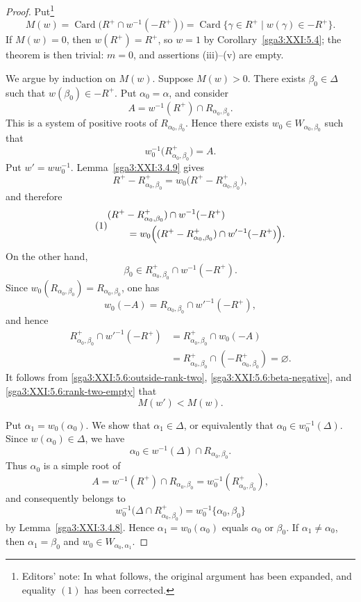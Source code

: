 \begin{proof}
Put\footnote{Editors' note: In what follows, the original argument has
been expanded, and equality \((1)\) has been corrected.}
\[
 M(w)
 =\operatorname{Card}\bigl(R^+\cap w^{-1}(-R^+)\bigr)
 =\operatorname{Card}\{\gamma\in R^+\mid w(\gamma)\in-R^+\}.
\]
If \(M(w)=0\), then \(w(R^+)=R^+\), so
\(w=1\) by Corollary~\ref{sga3:XXI:5.4}; the theorem is then
trivial: \(m=0\), and assertions (iii)--(v) are empty.

We argue by induction on \(M(w)\). Suppose \(M(w)>0\). There exists
\(\beta_0\in\Delta\) such that \(w(\beta_0)\in-R^+\). Put
\(\alpha_0=\alpha\), and consider
\[
 A=w^{-1}(R^+)\cap R_{\alpha_0,\beta_0}.
\]
This is a system of positive roots of
\(R_{\alpha_0,\beta_0}\). Hence there exists
\(w_0\in W_{\alpha_0,\beta_0}\) such that
\[
 w_0^{-1}\bigl(R^+_{\alpha_0,\beta_0}\bigr)=A.
\]
Put \(w'=ww_0^{-1}\). Lemma~\ref{sga3:XXI:3.4.9} gives
\[
 R^+-R^+_{\alpha_0,\beta_0}
 =
 w_0\bigl(R^+-R^+_{\alpha_0,\beta_0}\bigr),
\]
and therefore
\begin{equation}
\tag{1}
\label{sga3:XXI:5.6:outside-rank-two}
\begin{split}
 &(R^+-R^+_{\alpha_0,\beta_0})\cap w^{-1}(-R^+)\\
 &\qquad=
 w_0\Bigl((R^+-R^+_{\alpha_0,\beta_0})
             \cap w'^{-1}(-R^+)\Bigr).
\end{split}
\end{equation}
On the other hand,
\begin{equation}
\tag{2}
\label{sga3:XXI:5.6:beta-negative}
 \beta_0\in
 R^+_{\alpha_0,\beta_0}\cap w^{-1}(-R^+).
\end{equation}
Since
\(w_0(R_{\alpha_0,\beta_0})=R_{\alpha_0,\beta_0}\), one has
\[
 w_0(-A)
 =R_{\alpha_0,\beta_0}\cap w'^{-1}(-R^+),
\]
and hence
\begin{equation}
\tag{\(2'\)}
\label{sga3:XXI:5.6:rank-two-empty}
\begin{split}
 R^+_{\alpha_0,\beta_0}\cap w'^{-1}(-R^+)
 &=
 R^+_{\alpha_0,\beta_0}\cap w_0(-A)\\
 &=
 R^+_{\alpha_0,\beta_0}\cap(-R^+_{\alpha_0,\beta_0})
 =\varnothing.
\end{split}
\end{equation}
It follows from \eqref{sga3:XXI:5.6:outside-rank-two},
\eqref{sga3:XXI:5.6:beta-negative}, and
\eqref{sga3:XXI:5.6:rank-two-empty} that
\[
 M(w')<M(w).
\]

Put \(\alpha_1=w_0(\alpha_0)\). We show that
\(\alpha_1\in\Delta\), or equivalently that
\(\alpha_0\in w_0^{-1}(\Delta)\). Since
\(w(\alpha_0)\in\Delta\), we have
\[
 \alpha_0\in
 w^{-1}(\Delta)\cap R_{\alpha_0,\beta_0}.
\]
Thus \(\alpha_0\) is a simple root of
\[
 A
 =w^{-1}(R^+)\cap R_{\alpha_0,\beta_0}
 =w_0^{-1}(R^+_{\alpha_0,\beta_0}),
\]
and consequently belongs to
\[
 w_0^{-1}\bigl(\Delta\cap R^+_{\alpha_0,\beta_0}\bigr)
 =
 w_0^{-1}\{\alpha_0,\beta_0\}
\]
by Lemma~\ref{sga3:XXI:3.4.8}. Hence
\(\alpha_1=w_0(\alpha_0)\) equals \(\alpha_0\) or \(\beta_0\).
If \(\alpha_1\ne\alpha_0\), then
\(\alpha_1=\beta_0\) and
\(w_0\in W_{\alpha_0,\alpha_1}\).


\end{proof}
